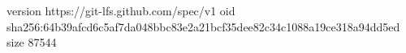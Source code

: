 version https://git-lfs.github.com/spec/v1
oid sha256:64b39afcd6c5af7da048bbc83e2a21bcf35dee82c34c1088a19ce318a94dd5ed
size 87544
